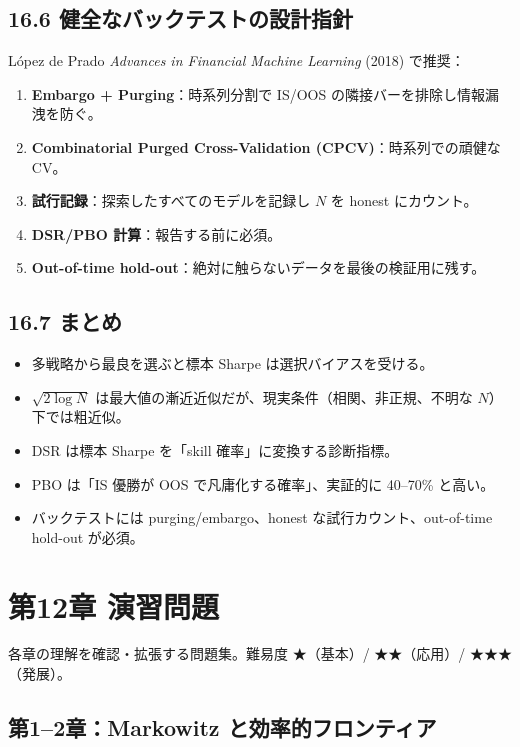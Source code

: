 \documentclass[11pt,a4paper]{report}
\begin{document}
\section{16.6 健全なバックテストの設計指針}

López de Prado \emph{Advances in Financial Machine Learning} (2018) で推奨：

\begin{enumerate}
\item \textbf{Embargo + Purging}：時系列分割で IS/OOS の隣接バーを排除し情報漏洩を防ぐ。
\item \textbf{Combinatorial Purged Cross-Validation (CPCV)}：時系列での頑健な CV。
\item \textbf{試行記録}：探索したすべてのモデルを記録し $N$ を honest にカウント。
\item \textbf{DSR/PBO 計算}：報告する前に必須。
\item \textbf{Out-of-time hold-out}：絶対に触らないデータを最後の検証用に残す。
\end{enumerate}

\section{16.7 まとめ}

\begin{itemize}
\item 多戦略から最良を選ぶと標本 Sharpe は選択バイアスを受ける。
\item $\sqrt{2 \log N}$ は最大値の漸近近似だが、現実条件（相関、非正規、不明な $N$）下では粗近似。
\item DSR は標本 Sharpe を「skill 確率」に変換する診断指標。
\item PBO は「IS 優勝が OOS で凡庸化する確率」、実証的に 40–70\% と高い。
\item バックテストには purging/embargo、honest な試行カウント、out-of-time hold-out が必須。
\end{itemize}

\noindent\hrulefill

\chapter{第12章 演習問題}

各章の理解を確認・拡張する問題集。難易度 ★（基本）/ ★★（応用）/ ★★★（発展）。

\section{第1–2章：Markowitz と効率的フロンティア}
\end{document}
